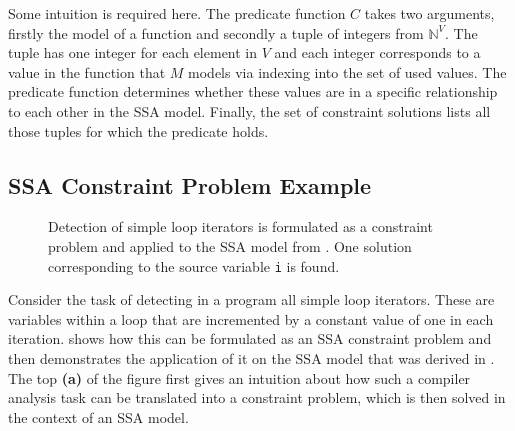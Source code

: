     Some intuition is required here.
    The predicate function $C$ takes two arguments, firstly the model of a
    function and secondly a tuple of integers from $\mathbb N^V$.
    The tuple has one integer for each element in $V$ and each integer
    corresponds to a value in the function that $M$ models via indexing
    into the set of used values.
    The predicate function determines whether these values are in a specific
    relationship to each other in the SSA model.
    Finally, the set of constraint solutions lists all those tuples for which
    the predicate holds.

\subsection{SSA Constraint Problem Example}

\begin{figure}[p]
    
\caption{Detection of simple loop iterators is formulated as a constraint
         problem and applied to the SSA model from .
         One solution corresponding to the source variable {\tt i} is found.}
\label{fig:constraintsolution}
\end{figure}

    Consider the task of detecting in a program all simple loop iterators.
    These are variables within a loop that are incremented by a constant value
    of one in each iteration.
     shows how this can be formulated as an
    SSA constraint problem and then demonstrates the application of it on the
    SSA model that was derived in .
    The top {\bf(a)} of the figure first gives an intuition about how such a
    compiler analysis task can be translated into a constraint problem, which is
    then solved in the context of an SSA model.

